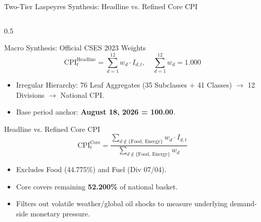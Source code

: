 \documentclass[aspectratio=169, 10pt]{beamer}
\begin{document}
\begin{frame}[shrink=10]{Two-Tier Laspeyres Synthesis: Headline vs. Refined Core CPI}
  \begin{columns}
    \begin{column}{0.5\textwidth}
      \begin{block}{Macro Synthesis: Official CSES 2023 Weights}
        \small
        \begin{equation*}
          \text{CPI}_t^{\text{Headline}} = \sum_{d=1}^{12} w_d \cdot I_{d, t}, \quad \sum_{d=1}^{12} w_d = 1.000
        \end{equation*}
        \begin{itemize}
          \item Irregular Hierarchy: 76 Leaf Aggregates (35 Subclasses + 41 Classes) $\rightarrow$ 12 Divisions $\rightarrow$ National CPI.
          \item Base period anchor: \textbf{August 18, 2026 = 100.00}.
        \end{itemize}
      \end{block}

      \begin{exampleblock}{Headline vs. Refined Core CPI}
        \small
        \begin{equation*}
          \text{CPI}_t^{\text{Core}} = \frac{\sum_{d \notin \{\text{Food, Energy}\}} w_d \cdot I_{d, t}}{\sum_{d \notin \{\text{Food, Energy}\}} w_d}
        \end{equation*}
        \begin{itemize}
          \item Excludes Food (44.775\%) and Fuel (Div 07/04).
          \item Core covers remaining \textbf{52.200\%} of national basket.
          \item Filters out volatile weather/global oil shocks to measure underlying demand-side monetary pressure.
        \end{itemize}
      \end{exampleblock}
    \end{column}


\end{columns}
\end{frame}
\end{document}
